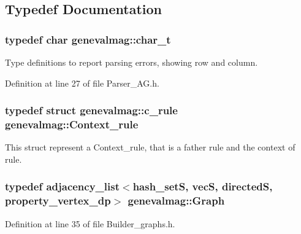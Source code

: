 \subsection{Typedef Documentation}
\hypertarget{namespacegenevalmag_a63d49b2e7b123ae54a8fdc03bcbde116}{
\subsubsection[{char\_\-t}]{\setlength{\rightskip}{0pt plus 5cm}typedef char {\bf genevalmag::char\_\-t}}}
\label{namespacegenevalmag_a63d49b2e7b123ae54a8fdc03bcbde116}
Type definitions to report parsing errors, showing row and column. 

Definition at line 27 of file Parser\_\-AG.h.

\hypertarget{namespacegenevalmag_a59ad19d59075a158ceb18d55009ce9a7}{
\subsubsection[{Context\_\-rule}]{\setlength{\rightskip}{0pt plus 5cm}typedef struct {\bf genevalmag::c\_\-rule}  {\bf genevalmag::Context\_\-rule}}}
\label{namespacegenevalmag_a59ad19d59075a158ceb18d55009ce9a7}
This struct represent a Context\_\-rule, that is a father rule and the context of rule. \hypertarget{namespacegenevalmag_a4a96de9ebfc7d48233406ab9cad55cb5}{
\subsubsection[{Graph}]{\setlength{\rightskip}{0pt plus 5cm}typedef adjacency\_\-list$<$hash\_\-setS, vecS, directedS, property\_\-vertex\_\-dp$>$ {\bf genevalmag::Graph}}}
\label{namespacegenevalmag_a4a96de9ebfc7d48233406ab9cad55cb5}


Definition at line 35 of file Builder\_\-graphs.h.

